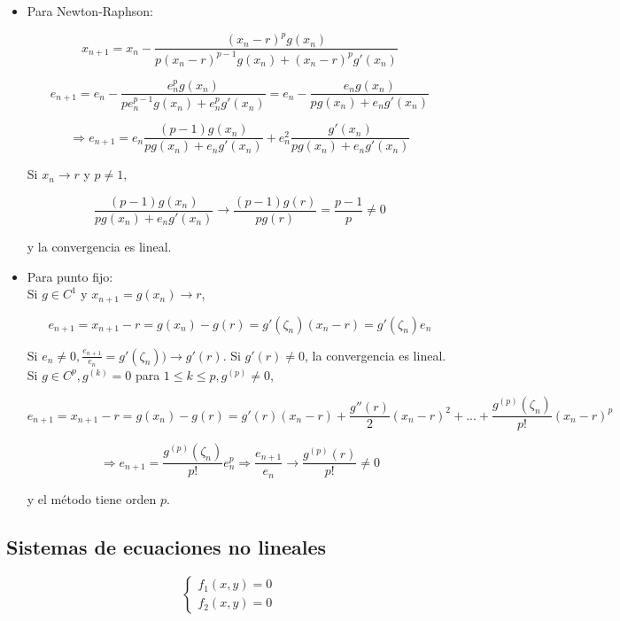 \begin{itemize}
    \item Para Newton-Raphson:

    $$x_{n + 1} = x_{n} - \frac{(x_{n} - r)^{p}g(x_{n})}{p(x_{n} - r)^{p - 1}g(x_{n}) + (x_{n} - r)^{p}g'(x_{n})}$$

    $$e_{n + 1} = e_{n} - \frac{e_{n}^{p}g(x_{n})}{pe_{n}^{p - 1}g(x_{n}) + e_{n}^{p}g'(x_{n})} = e_{n} - \frac{e_{n}g(x_{n})}{pg(x_{n}) + e_{n}g'(x_{n})}$$

    $$\Rightarrow e_{n + 1} = e_{n}\frac{(p - 1)g(x_{n})}{pg(x_{n}) + e_{n}g'(x_{n})} + e_{n}^{2}\frac{g'(x_{n})}{pg(x_{n}) + e_{n}g'(x_{n})}$$

    Si $x_{n} \rightarrow r$ y $p \neq 1$,

    $$\frac{(p - 1)g(x_{n})}{pg(x_{n}) + e_{n}g'(x_{n})} \rightarrow \frac{(p - 1)g(r)}{pg(r)} = \frac{p - 1}{p} \neq 0$$

    y la convergencia es lineal.\\

    \item Para punto fijo:\\

    Si $g \in C^{1}$ y $x_{n + 1} = g(x_{n}) \rightarrow r$,

    $$e_{n + 1} = x_{n + 1} - r = g(x_{n}) - g(r) = g'(\zeta_{n})(x_{n} - r) = g'(\zeta_{n})e_{n}$$

    Si $e_{n} \neq 0, \frac{e_{n + 1}}{e_{n}} = g'(\zeta_{n})) \rightarrow g'(r)$. Si $g'(r) \neq 0$, la convergencia es lineal. Si $g \in C^{p}, g^{(k)} = 0$ para $1 \leq k \leq p, g^{(p)} \neq 0$,

    $$e_{n + 1} = x_{n + 1} - r = g(x_{n}) - g(r) = g'(r)(x_{n} - r) + \frac{g''(r)}{2}(x_{n} - r)^{2} + ... + \frac{g^{(p)}(\zeta_{n})}{p!}(x_{n} - r)^{p}$$

    $$\Rightarrow e_{n + 1} = \frac{g^{(p)}(\zeta_{n})}{p!}e_{n}^{p} \Rightarrow \frac{e_{n + 1}}{e_{n}} \rightarrow \frac{g^{(p)}(r)}{p!} \neq 0$$

    y el m\'etodo tiene orden $p$.
\end{itemize}

\subsection{Sistemas de ecuaciones no lineales}

$$
    \begin{cases}
        f_{1}(x, y) = 0\\
        f_{2}(x, y) = 0
    \end{cases}
$$\\

